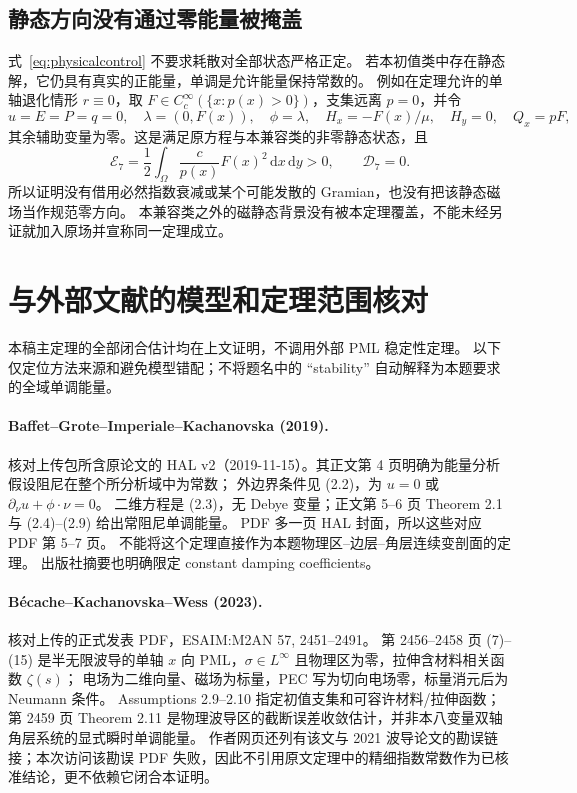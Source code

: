 \documentclass[UTF8,a4paper,11pt,fontset=none]{ctexart}
\numberwithin{equation}{section}
\theoremstyle{definition}
\theoremstyle{definition}
\newcommand{\Om}{\Omega}
\newcommand{\dd}{\,\mathrm d}
\newcommand{\Ecal}{\mathcal E}
\newcommand{\Dcal}{\mathcal D}
\begin{document}
\subsection{静态方向没有通过零能量被掩盖}
式~\eqref{eq:physicalcontrol} 不要求耗散对全部状态严格正定。
若本初值类中存在静态解，它仍具有真实的正能量，单调是允许能量保持常数的。
例如在定理允许的单轴退化情形 $r\equiv0$，取 $F\in C_c^\infty(\{x:p(x)>0\})$，支集远离 $p=0$，并令
\[
 u=E=P=q=0,\quad \lambda=(0,F(x)),\quad\phi=\lambda,
 \quad H_x=-F(x)/\mu,\quad H_y=0,\quad Q_x=pF,
\]
其余辅助变量为零。这是满足原方程与本兼容类的非零静态状态，且
\[
 \Ecal_7=\frac12\int_\Om\frac c{p(x)}F(x)^2\dd x\dd y>0,
 \qquad\Dcal_7=0.
\]
所以证明没有借用必然指数衰减或某个可能发散的 Gramian，也没有把该静态磁场当作规范零方向。
本兼容类之外的磁静态背景没有被本定理覆盖，不能未经另证就加入原场并宣称同一定理成立。

\section{与外部文献的模型和定理范围核对}
\label{sec:literature}

本稿主定理的全部闭合估计均在上文证明，不调用外部 PML 稳定性定理。
以下仅定位方法来源和避免模型错配；不将题名中的 ``stability'' 自动解释为本题要求的全域单调能量。

\paragraph{Baffet--Grote--Imperiale--Kachanovska (2019).}
核对上传包所含原论文的 HAL v2（2019-11-15）。其正文第 4 页明确为能量分析假设阻尼在整个所分析域中为常数；
外边界条件见 (2.2)，为 $u=0$ 或 $\partial_\nu u+\phi\cdot\nu=0$。
二维方程是 (2.3)，无 Debye 变量；正文第 5--6 页 Theorem 2.1 与 (2.4)--(2.9) 给出常阻尼单调能量。
PDF 多一页 HAL 封面，所以这些对应 PDF 第 5--7 页。
不能将这个定理直接作为本题物理区--边层--角层连续变剖面的定理。
出版社摘要也明确限定 constant damping coefficients\cite{baffet2019}。

\paragraph{Bécache--Kachanovska--Wess (2023).}
核对上传的正式发表 PDF，ESAIM:M2AN 57, 2451--2491。
第 2456--2458 页 (7)--(15) 是半无限波导的单轴 $x$ 向 PML，$\sigma\in L^\infty$ 且物理区为零，拉伸含材料相关函数 $\zeta(s)$；
电场为二维向量、磁场为标量，PEC 写为切向电场零，标量消元后为 Neumann 条件。
Assumptions 2.9--2.10 指定初值支集和可容许材料/拉伸函数；第 2459 页 Theorem 2.11 是物理波导区的截断误差收敛估计，并非本八变量双轴角层系统的显式瞬时单调能量\cite{becache2023}。
作者网页还列有该文与 2021 波导论文的勘误链接；本次访问该勘误 PDF 失败，因此不引用原文定理中的精细指数常数作为已核准结论，更不依赖它闭合本证明。
\end{document}
